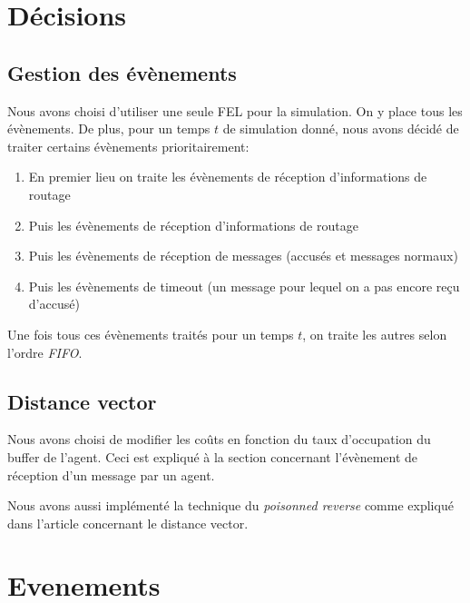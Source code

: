 \documentclass[a4paper,11pt]{article}
\begin{document}

\tableofcontents %
\listoffigures %
\lstlistoflistings
\pagebreak




\section{Décisions}

\subsection{Gestion des évènements}
Nous avons choisi d'utiliser une seule FEL pour la simulation. On y place tous les évènements. De plus, pour un temps $t$ de simulation donné, nous avons décidé de traiter certains évènements prioritairement:

\begin{enumerate}
 \item En premier lieu on traite les évènements de réception d'informations de routage
 \item Puis les évènements de réception d'informations de routage
 \item Puis les évènements de réception de messages (accusés et messages normaux)
 \item Puis les évènements de timeout (un message pour lequel on a pas encore reçu d'accusé)
\end{enumerate}

Une fois tous ces évènements traités pour un temps $t$, on traite les autres selon l'ordre \textit{FIFO}.

\subsection{Distance vector}
Nous avons choisi de modifier les coûts en fonction du taux d'occupation du buffer de l'agent. Ceci est expliqué à la section  concernant l'évènement de réception d'un message par un agent.

Nous avons aussi implémenté la technique du \textit{poisonned reverse} comme expliqué dans l'article concernant le distance vector.








\section{Evenements}
\end{document}
